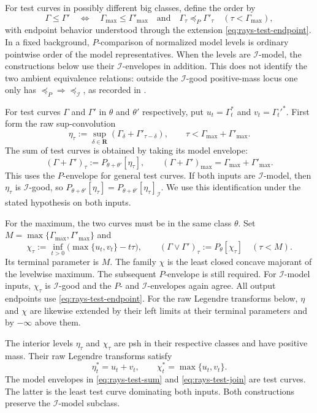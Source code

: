 For test curves in possibly different big classes, define the
order by
\[
 \Gamma\leq\Gamma'
 \quad\Longleftrightarrow\quad
 \Gamma_{\max}\leq\Gamma'_{\max}
 \quad\text{and}\quad
 \Gamma_\tau\preceq_P\Gamma'_\tau
 \quad(\tau<\Gamma_{\max}),
\tag{52.22}\label{eq:rays-test-order}
\]
with endpoint behavior understood through the extension
\eqref{eq:rays-test-endpoint}.
In a fixed background, $P$-comparison of normalized model levels
is ordinary pointwise order of the model representatives.  When the levels are $\mathcal I$-model,
the constructions below use their $\mathcal I$-envelopes in addition.
This does not identify the two ambient equivalence relations: outside the
$\mathcal I$-good positive-mass locus one only has
$\preceq_P\Rightarrow\preceq_{\mathcal I}$, as recorded in
.

For test curves $\Gamma$ and $\Gamma'$ in $\theta$ and
$\theta'$ respectively, put
$u_t=\Gamma_t^*$ and $v_t=\Gamma_t'^*$.
First form the raw sup-convolution
\[
 \eta_\tau:=\sup_{\delta\in\mathbf R}
             (\Gamma_\delta+\Gamma'_{\tau-\delta}),
 \qquad \tau<\Gamma_{\max}+\Gamma'_{\max}.
\]
The sum of test curves is obtained by taking its model envelope:
\[
 (\Gamma+\Gamma')_\tau:=P_{\theta+\theta'}[\eta_\tau],
 \qquad
 (\Gamma+\Gamma')_{\max}=\Gamma_{\max}+\Gamma'_{\max}.
\tag{52.23}\label{eq:rays-test-sum}
\]
This uses the $P$-envelope for general test curves.
If both inputs are $\mathcal I$-model, then $\eta_\tau$ is
$\mathcal I$-good, so
$P_{\theta+\theta'}[\eta_\tau]
 =P_{\theta+\theta'}[\eta_\tau]_{\mathcal I}$.
We use this identification under the stated hypothesis on both inputs.

For the maximum, the two curves must be in the same class $\theta$.
Set $M=\max\{\Gamma_{\max},\Gamma'_{\max}\}$ and
\[
 \chi_\tau:=\inf_{t>0}\bigl(\max\{u_t,v_t\}-t\tau\bigr),
 \qquad
 (\Gamma\vee\Gamma')_\tau:=P_\theta[\chi_\tau]
 \quad(\tau<M).
\tag{52.23a}\label{eq:rays-test-join}
\]
Its terminal parameter is $M$.
The family $\chi$ is the least closed concave majorant of the levelwise
maximum. The subsequent $P$-envelope is still required.
For $\mathcal I$-model inputs, $\chi_\tau$ is $\mathcal I$-good
and the $P$- and $\mathcal I$-envelopes again agree.
All output endpoints use \eqref{eq:rays-test-endpoint}.
For the raw Legendre transforms below, $\eta$ and $\chi$ are likewise
extended by their left limits at their terminal parameters and by
$-\infty$ above them.

\begin{proposition}\label{prop:rays-raw-operations}
The interior levels $\eta_\tau$ and $\chi_\tau$ are psh in their
respective classes and have positive mass. Their raw Legendre
transforms satisfy
\[
                 \eta_t^*=u_t+v_t,\qquad
                 \chi_t^*=\max\{u_t,v_t\}.
\tag{52.23b}\label{eq:rays-raw-operations}
\]
The model envelopes in \eqref{eq:rays-test-sum} and
\eqref{eq:rays-test-join} are test curves.
The latter is the least test curve dominating both inputs.
Both constructions preserve the $\mathcal I$-model subclass.
\end{proposition}

